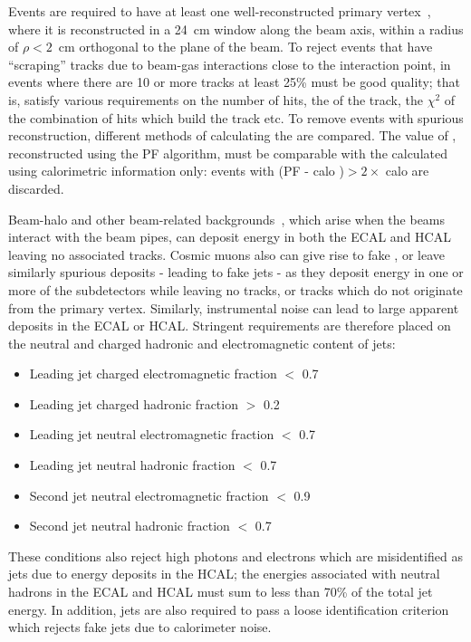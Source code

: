 Events are required to have at least one well-reconstructed primary vertex~\cite{bib:ANA_Tk}, where it is reconstructed in a 24~cm window along the beam axis, within a radius of $\rho<2$~cm orthogonal to the plane of the beam. %
To reject events that have ``scraping'' tracks due to beam-gas interactions close to the interaction point, in events where there are 10 or more tracks at least 25\% must be good quality; that is, satisfy various requirements on the number of hits, the \pt of the track, the $\chi^{2}$ of the combination of hits which build the track etc.
To remove events with spurious \MET reconstruction, different methods of calculating the \MET are compared. The value of \MET, reconstructed using the \ac{PF} algorithm, must be comparable with the \MET calculated using calorimetric information only: events with (PF \MET - calo \MET)$ > 2 \times$ calo \MET are discarded.





Beam-halo and other beam-related backgrounds~\cite{bib:ANA_BeamHalo}, which arise when the beams interact with the beam pipes, 
can deposit energy in both the \ac{ECAL} and \ac{HCAL} leaving no associated tracks.
Cosmic muons also can give rise to fake \MET, 
or leave similarly spurious deposits - leading to fake jets - as they deposit energy in one or more of the subdetectors while leaving no tracks, or tracks which do not originate from the primary vertex.
Similarly, instrumental noise can lead to large apparent deposits in the \ac{ECAL} or \ac{HCAL}. 
Stringent requirements are therefore placed on the neutral and charged hadronic and electromagnetic content of jets:
\begin{itemize}
\item Leading jet charged electromagnetic fraction $<$ 0.7
\item Leading jet charged hadronic fraction $>$ 0.2
\item Leading jet neutral electromagnetic fraction $<$ 0.7
\item Leading jet neutral hadronic fraction $<$ 0.7
\item Second jet neutral electromagnetic fraction $<$ 0.9
\item Second jet neutral hadronic fraction $<$ 0.7
\end{itemize}
These conditions also reject high \pt{} photons and electrons which are misidentified as jets due to 
energy deposits in the \ac{HCAL}; the energies associated with neutral hadrons in the 
ECAL and HCAL must sum to less than 70\% of the total jet energy.
In addition, jets are also required to pass a loose identification criterion which rejects fake jets due to calorimeter noise. 

